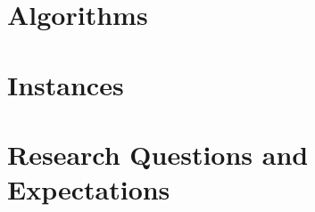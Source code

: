 \documentclass{article}
\begin{document}
\section{Algorithms}

\section{Instances}

\section{Research Questions and Expectations}
%
\end{document}
